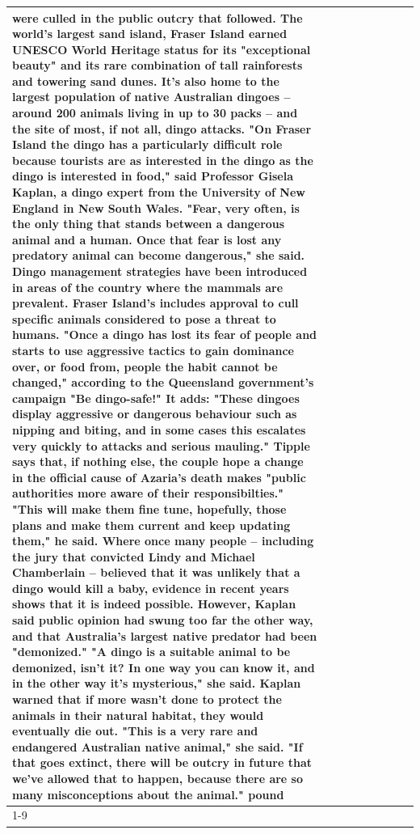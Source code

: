 \begin{table}[H]
\begin{tabular}{lllrlllll}
were culled in the public outcry that followed. The world's largest sand island, Fraser Island earned UNESCO World Heritage status for its "exceptional beauty" and its rare combination of tall rainforests and towering sand dunes. It's also home to the largest population of native Australian dingoes -- around 200 animals living in up to 30 packs -- and the site of most, if not all, dingo attacks. "On Fraser Island the dingo has a particularly difficult role because tourists are as interested in the dingo as the dingo is interested in food," said Professor Gisela Kaplan, a dingo expert from the University of New England in New South Wales. "Fear, very often, is the only thing that stands between a dangerous animal and a human. Once that fear is lost any predatory animal can become dangerous," she said. Dingo management strategies have been introduced in areas of the country where the mammals are prevalent. Fraser Island's includes approval to cull specific animals considered to pose a threat to humans. "Once a dingo has lost its fear of people and starts to use aggressive tactics to gain dominance over, or food from, people the habit cannot be changed," according to the Queensland government's campaign "Be dingo-safe!" It adds: "These dingoes display aggressive or dangerous behaviour such as nipping and biting, and in some cases this escalates very quickly to attacks and serious mauling." Tipple says that, if nothing else, the couple hope a change in the official cause of Azaria's death makes "public authorities more aware of their responsibilties." "This will make them fine tune, hopefully, those plans and make them current and keep updating them," he said. Where once many people -- including the jury that convicted Lindy and Michael Chamberlain -- believed that it was unlikely that a dingo would kill a baby, evidence in recent years shows that it is indeed possible. However, Kaplan said public opinion had swung too far the other way, and that Australia's largest native predator had been "demonized." "A dingo is a suitable animal to be demonized, isn't it? In one way you can know it, and in the other way it's mysterious," she said. Kaplan warned that if more wasn't done to protect the animals in their natural habitat, they would eventually die out. "This is a very rare and endangered Australian native animal," she said. "If that goes extinct, there will be outcry in future that we've allowed that to happen, because there are so many misconceptions about the animal." pound \\
\cline{1-9}

\end{tabular}
\end{table}
